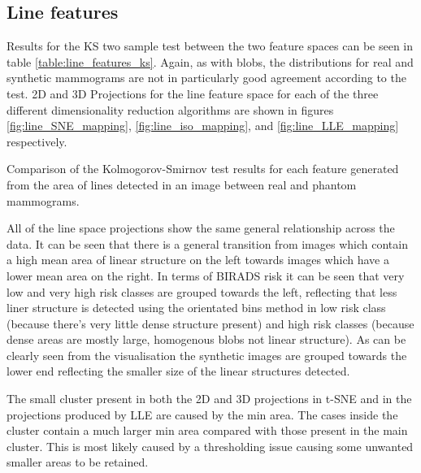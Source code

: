 \clearpage

\subsection{Line features}
Results for the KS two sample test between the two feature spaces can be seen in table \ref{table:line_features_ks}. Again, as with blobs, the distributions for real and synthetic mammograms are not in particularly good agreement according to the test. 2D and 3D Projections for the line feature space for each of the three different dimensionality reduction algorithms are shown in figures \ref{fig:line_SNE_mapping}, \ref{fig:line_iso_mapping}, and \ref{fig:line_LLE_mapping} respectively.
 
\begin{table}[H]
\label{table:line_features_ks}
\centering
{}
\caption{Comparison of the Kolmogorov-Smirnov test results for each feature generated from the area of lines detected in an image between real and phantom mammograms.}
\end{table}

All of the line space projections show the same general relationship across the data. It can be seen that there is a general transition from images which contain a high mean area of linear structure on the left towards images which have a lower mean area on the right. In terms of BIRADS risk it can be seen that very low and very high risk classes are grouped towards the left, reflecting that less liner structure is detected using the orientated bins method in low risk class (because there's very little dense structure present) and high risk classes (because dense areas are mostly large, homogenous blobs not linear structure). As can be clearly seen from the visualisation the synthetic images are grouped towards the lower end reflecting the smaller size of the linear structures detected. 

The small cluster present in both the 2D and 3D projections in t-SNE and in the projections produced by LLE are caused by the min area. The cases inside the cluster contain a much larger min area compared with those present in the main cluster. This is most likely caused by a thresholding issue causing some unwanted smaller areas to be retained.


